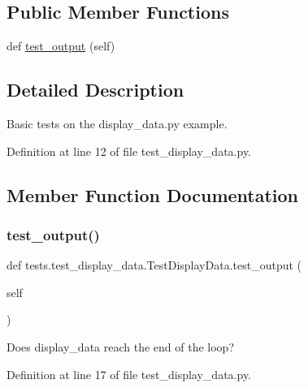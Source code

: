 \subsection*{Public Member Functions}
\begin{DoxyCompactItemize}
\item 
def \hyperlink{classtests_1_1test__display__data_1_1TestDisplayData_ad9482f68927957ca12e22f14b5b096a0}{test\+\_\+output} (self)
\end{DoxyCompactItemize}


\subsection{Detailed Description}
\begin{DoxyVerb}Basic tests on the display_data.py example.
\end{DoxyVerb}
 

Definition at line 12 of file test\+\_\+display\+\_\+data.\+py.



\subsection{Member Function Documentation}
\mbox{\label{classtests_1_1test__display__data_1_1TestDisplayData_ad9482f68927957ca12e22f14b5b096a0}} 
\subsubsection{\texorpdfstring{test\+\_\+output()}{test\_output()}}
{\footnotesize\ttfamily def tests.\+test\+\_\+display\+\_\+data.\+Test\+Display\+Data.\+test\+\_\+output (\begin{DoxyParamCaption}\item[{}]{self }\end{DoxyParamCaption})}

\begin{DoxyVerb}Does display_data reach the end of the loop?
\end{DoxyVerb}
 

Definition at line 17 of file test\+\_\+display\+\_\+data.\+py.


